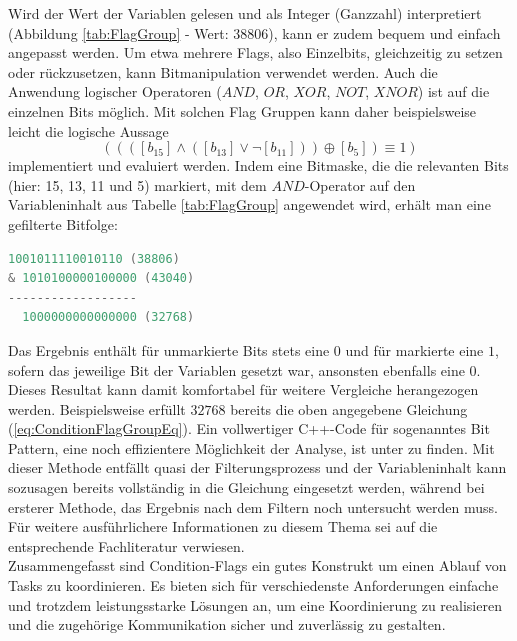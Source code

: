 \documentclass{llncs}
\begin{document}
Wird der Wert der Variablen gelesen und als Integer (Ganzzahl) interpretiert (Abbildung \ref{tab:FlagGroup} - Wert: $38806$), kann er zudem bequem und einfach angepasst werden. Um etwa mehrere Flags, also Einzelbits, gleichzeitig zu setzen oder rückzusetzen, kann Bitmanipulation verwendet werden. Auch die Anwendung logischer Operatoren ($AND$, $OR$, $XOR$, $NOT$, $XNOR$) ist auf die einzelnen Bits möglich. Mit solchen Flag Gruppen kann daher beispielsweise leicht die logische Aussage
\begin{equation}
((([b_{15}] \wedge ([b_{13}] \vee \neg[b_{11}]))\oplus [b_{5}])\equiv 1)
\label{eq:ConditionFlagGroupEq}
\end{equation}
implementiert und evaluiert werden. Indem eine Bitmaske, die die relevanten Bits (hier: 15, 13, 11 und 5) markiert, mit dem $AND$-Operator auf den Variableninhalt aus Tabelle \ref{tab:FlagGroup} angewendet wird, erhält man eine gefilterte Bitfolge:
{
\lstset{basicstyle=\footnotesize, frame=tb, xleftmargin=.36\textwidth, xrightmargin=.3\textwidth}
\begin{lstlisting}[language=C]
  1001011110010110 (38806)
& 1010100000100000 (43040)
------------------
  1000000000000000 (32768)
\end{lstlisting}
}
Das Ergebnis enthält für unmarkierte Bits stets eine $0$ und für markierte eine $1$, sofern das jeweilige Bit der Variablen gesetzt war, ansonsten ebenfalls eine $0$. Dieses Resultat kann damit komfortabel für weitere Vergleiche herangezogen werden. Beispielsweise erfüllt $32768$ bereits die oben angegebene Gleichung (\ref{eq:ConditionFlagGroupEq}). Ein vollwertiger C++-Code für sogenanntes Bit Pattern, eine noch effizientere Möglichkeit der Analyse, ist unter \autocite{Turner2020} zu finden. Mit dieser Methode entfällt quasi der Filterungsprozess und der Variableninhalt kann sozusagen bereits vollständig in die Gleichung eingesetzt werden, während bei ersterer Methode, das Ergebnis nach dem Filtern noch untersucht werden muss. Für weitere ausführlichere Informationen zu diesem Thema sei auf die entsprechende Fachliteratur verwiesen.\\

Zusammengefasst sind Condition-Flags ein gutes Konstrukt um einen Ablauf von Tasks zu koordinieren. Es bieten sich für verschiedenste Anforderungen einfache und trotzdem leistungsstarke Lösungen an, um eine Koordinierung zu realisieren und die zugehörige Kommunikation sicher und zuverlässig zu gestalten.
\end{document}
